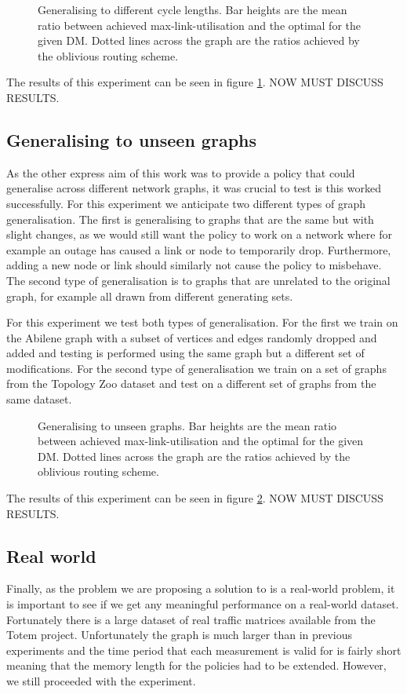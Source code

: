 \begin{figure}
    \centering
    
    \caption{Generalising to different cycle lengths. Bar heights are the mean ratio between achieved max-link-utilisation and the optimal for the given DM. Dotted lines across the graph are the ratios achieved by the oblivious routing scheme.}
    \label{fig:exp_vary}
\end{figure}

The results of this experiment can be seen in figure \ref{fig:exp_vary}. NOW MUST DISCUSS RESULTS.

\subsection{Generalising to unseen graphs}
As the other express aim of this work was to provide a policy that could generalise across different network graphs, it was crucial to test is this worked successfully. For this experiment we anticipate two different types of graph generalisation. The first is generalising to graphs that are the same but with slight changes, as we would still want the policy to work on a network where for example an outage has caused a link or node to temporarily drop. Furthermore, adding a new node or link should similarly not cause the policy to misbehave. The second type of generalisation is to graphs that are unrelated to the original graph, for example all drawn from different generating sets.

For this experiment we test both types of generalisation. For the first we train on the Abilene graph with a subset of vertices and edges randomly dropped and added and testing is performed using the same graph but a different set of modifications. For the second type of generalisation we train on a set of graphs from the Topology Zoo dataset and test on a different set of graphs from the same dataset.

\begin{figure}
    \centering
    
    \caption{Generalising to unseen graphs. Bar heights are the mean ratio between achieved max-link-utilisation and the optimal for the given DM. Dotted lines across the graph are the ratios achieved by the oblivious routing scheme.}
    \label{fig:exp_graphs}
\end{figure}

The results of this experiment can be seen in figure \ref{fig:exp_graphs}. NOW MUST DISCUSS RESULTS.

\subsection{Real world}
Finally, as the problem we are proposing a solution to is a real-world problem, it is important to see if we get any meaningful performance on a real-world dataset. Fortunately there is a large dataset of real traffic matrices available from the Totem\cite{uhlig2006providing} project. Unfortunately the graph is much larger than in previous experiments and the time period that each measurement is valid for is fairly short meaning that the memory length for the policies had to be extended. However, we still proceeded with the experiment.

